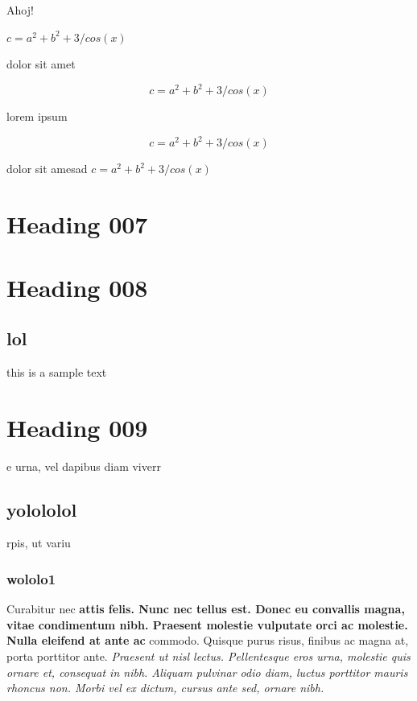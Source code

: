 \documentclass{article}
\begin{document}
Ahoj!

\begin{math}
    c = a ^ 2 + b ^ 2 + 3/cos(x)
\end{math}

dolor sit amet

\begin{equation}
    c = a ^ 2 + b ^ 2 + 3/cos(x)    
\end{equation}

lorem ipsum

\begin{displaymath}
    c = a ^ 2 + b ^ 2 + 3/cos(x)
\end{displaymath}

dolor sit amesad $c = a ^ 2 + b ^ 2 + 3/cos(x)$

\section*{Heading 007}
\section{Heading 008}
\subsection{lol}
this is a sample text
\section{Heading 009}
e urna, vel dapibus diam viverr
\subsection{yolololol}
rpis, ut variu
\subsubsection{wololo1}
Curabitur nec 
\textbf{    
attis felis. Nunc nec tellus est. Donec eu convallis magna, vitae condimentum nibh. Praesent molestie vulputate orci ac molestie. Nulla eleifend at ante ac 
}
commodo. Quisque purus risus, finibus ac magna at, porta porttitor ante. 
\textit{
Praesent ut nisl lectus. Pellentesque eros urna, molestie quis ornare et, consequat in nibh. Aliquam pulvinar odio diam, luctus porttitor mauris rhoncus non. Morbi vel ex dictum, cursus ante sed, ornare nibh.
}
\end{document}

